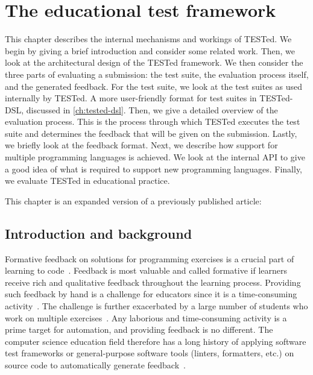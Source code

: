 \documentclass[../main]{subfiles}
\begin{document}
\chapter{The \tested{} educational test framework}\label{ch:tested-deel-1-tijdelijke-titel}

This chapter describes the internal mechanisms and workings of TESTed.
We begin by giving a brief introduction and consider some related work.
Then, we look at the architectural design of the TESTed framework.
We then consider the three parts of evaluating a submission:
the test suite, the evaluation process itself, and the generated feedback.
For the test suite, we look at the test suites as used internally by TESTed.
A more user-friendly format for test suites in TESTed-DSL, discussed in \cref{ch:tested-dsl}.
Then, we give a detailed overview of the evaluation process.
This is the process through which TESTed executes the test suite and determines the feedback that will be given on the submission.
Lastly, we briefly look at the feedback format.
Next, we describe how support for multiple programming languages is achieved.
We look at the internal API to give a good idea of what is required to support new programming languages.
Finally, we evaluate TESTed in educational practice.

This chapter is an expanded version of a previously published article:
\par
{}

\section{Introduction and background}\label{sec:introduction-and-background}

Formative feedback on solutions for programming exercises is a crucial part of learning to code~\autocite{shute_focus_2008,orrell_feedback_2006,luxton-reilly_introductory_2018}.
Feedback is most valuable and called formative if learners receive rich and qualitative feedback throughout the learning process.
Providing such feedback by hand is a challenge for educators since it is a time-consuming activity~\autocite{campos_multinational_2012, cheang_automated_2003, keuning_systematic_2018, hao_towards_2021, zavala_use_2018, staubitz_towards_2017, pirttinen_crowdsourcing_2018, gulwani_feedback_2014, tang_data-driven_2016, edwards_using_2004}.
The challenge is further exacerbated by a large number of students who work on multiple exercises~\autocite{camp_generation_2017, sax_examining_2017}.
Any laborious and time-consuming activity is a prime target for automation, and providing feedback is no different.
The computer science education field therefore has a long history of applying software test frameworks or general-purpose software tools (linters, formatters, etc.) on source code to automatically generate feedback~\autocite{hao_towards_2021, edwards_using_2004, paiva_automated_2022, keuning_systematic_2018}.
\end{document}

